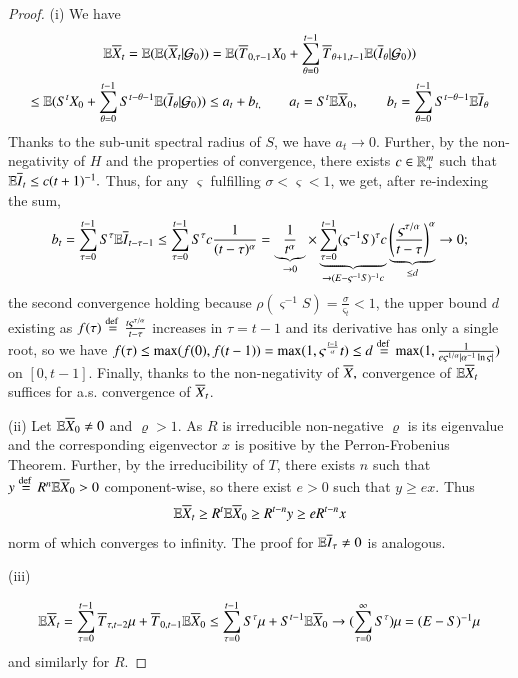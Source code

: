 \documentclass[english]{elsarticle}
\theoremstyle{plain}
\theoremstyle{remark}
\theoremstyle{plain}
\theoremstyle{definition}
\begin{document}
\begin{proof}
(i) We have 
\begin{multline*}
\mathbb{E}\overline{X}_{t}=\mathbb{E}(\mathbb{E}(\overline{X}_{t}|\mathcal{G}_{0}))=\mathbb{E}(\overline{T}_{0,\tau-1}X_{0}+\sum_{\theta=0}^{t-1}\overline{T}_{\theta+1,t-1}\mathbb{E}(\overline{I}_{\theta}|\mathcal{G}_{0}))\\
\leq\mathbb{E}(S^{t}X_{0}+\sum_{\theta=0}^{t-1}S^{t-\theta-1}\mathbb{E}(\overline{I}_{\theta}|\mathcal{G}_{0}))\leq a_{t}+b_{t,}\qquad a_{t}=S^{t}\mathbb{E}\overline{X}_{0},\qquad b_{t}=\sum_{\theta=0}^{t-1}S^{t-\theta-1}\mathbb{E}\overline{I}_{\theta}
\end{multline*}
Thanks to the sub-unit spectral radius of $S$, we have $a_{t}\rightarrow0$.
Further, by the non-negativity of $H$ and the properties of convergence,
there exists $c\in\mathbb{R}_{+}^{m}$ such that $\mathbb{E}\overline{I}_{t}\leq c(t+1)^{-1}.$
Thus, for any $\varsigma$ fulfilling $\sigma<\varsigma<1$, we get,
after re-indexing the sum, 
\[
b_{t}=\sum_{\tau=0}^{t-1}S^{\tau}\mathbb{E}\overline{I}_{t-\tau-1}\leq\sum_{\tau=0}^{t-1}S^{\tau}c\frac{1}{(t-\tau)^{\alpha}}=\underbrace{\frac{1}{t^{\alpha}}}_{\rightarrow0}\times\underbrace{\sum_{\tau=0}^{t-1}(\varsigma^{-1}S)^{\tau}c}_{\rightarrow(E-\varsigma^{-1}S)^{-1}c}\underbrace{\left(\frac{\varsigma^{\tau/\alpha}}{t-\tau}\right)^{\alpha}}_{\leq d}\rightarrow0;
\]
the second convergence holding because $\rho(\varsigma^{-1}S)=\frac{\sigma}{\varsigma_{t}}<1$,
the upper bound $d$ existing as $f(\tau)\stackrel{\text{def }}{=}\frac{t\varsigma^{\tau/\alpha}}{t-\tau}$
increases in $\tau=t-1$ and its derivative has only a single root,
so we have $f(\tau)\leq\max(f(0),f(t-1))=\max(1,\varsigma^{\frac{t-1}{\alpha}}t)\leq d\stackrel{\text{def }}{=}\max(1,\frac{1}{e\varsigma^{1/\alpha}|\alpha^{-1}\ln\varsigma|})$
on $[0,t-1].$ Finally, thanks to the non-negativity of $\overline{X},$
convergence of $\mathbb{E}\overline{X}_{t}$ suffices for a.s. convergence of $\overline{X}_{t}$.

(ii) Let $\mathbb{E}\overline{X}_{0}\neq0$ and $\varrho>1$. As $R$ is irreducible
non-negative $\varrho$ is its eigenvalue and the corresponding eigenvector
$x$ is positive by the Perron-Frobenius Theorem. Further, by the
irreducibility of $T$, there exists $n$ such that $y\stackrel{\text{def }}{=} R^{n}\mathbb{E}\overline{X}_{0}>0$
component-wise, so there exist $e>0$ such that $y\geq ex$. Thus
\[
\mathbb{E}\overline{X}_{t}\geq R^{t}\mathbb{E}\overline{X}_{0}\geq R^{t-n}y\geq eR^{t-n}x
\]
norm of which converges to infinity. The proof for $\mathbb{E}\overline{I}_{\tau}\neq0$
is analogous.

(iii)

\begin{multline*}
\E\barX_{t}
=\sum_{\tau=0}^{t-1}\barT_{\tau,t-2}\mu+\barT_{0,t-1}\E\barX_{0}\leq\sum_{\tau=0}^{t-1}
S^{\tau}\mu+S^{t-1}\E\barX_{0}
\rightarrow (\sum_{\tau=0}^{\infty}S^{\tau}) 
\mu
$
$
=(E-S)^{-1}
\mu
\end{multline*}
and similarly for $R.$

\end{proof}
\end{document}
